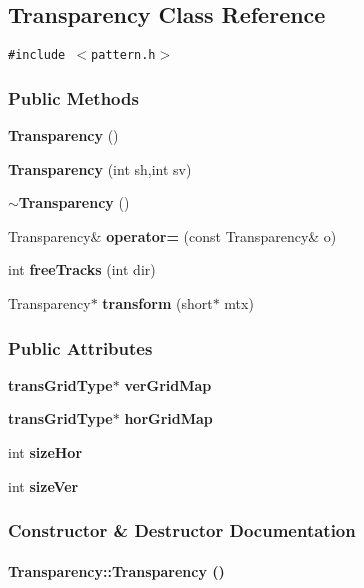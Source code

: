 \subsection{Transparency  Class Reference}
\label{Transparency}
{\tt \#include $<$pattern.h$>$}

\subsubsection*{Public Methods}
\begin{CompactItemize}
\item 
{\bf Transparency} ()
\item 
{\bf Transparency} (int sh,int sv)
\item 
{\bf $\sim$Transparency} ()
\item 
Transparency\& {\bf operator=} (const Transparency\& o)
\item 
int {\bf free\-Tracks} (int dir)
\item 
Transparency$\ast$ {\bf transform} (short$\ast$ mtx)
\end{CompactItemize}
\subsubsection*{Public Attributes}
\begin{CompactItemize}
\item 
{\bf trans\-Grid\-Type}$\ast$ {\bf ver\-Grid\-Map}
\item 
{\bf trans\-Grid\-Type}$\ast$ {\bf hor\-Grid\-Map}
\item 
int {\bf size\-Hor}
\item 
int {\bf size\-Ver}
\end{CompactItemize}


\subsubsection{Constructor \& Destructor Documentation}
\label{Transparency_a0}
\paragraph{\setlength{\rightskip}{0pt plus 5cm}Transparency::Transparency ()\hspace{0.3cm}{\tt  [inline]}}\hfill



